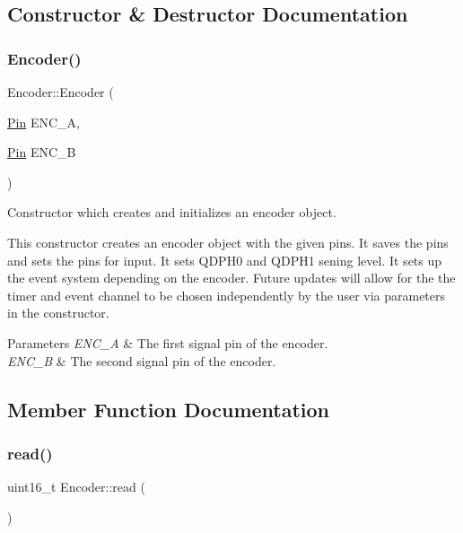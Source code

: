 \subsection{Constructor \& Destructor Documentation}
\mbox{\label{class_encoder_a93f2fbbe579422d267b87cf7a6673caf}} 
\subsubsection{\texorpdfstring{Encoder()}{Encoder()}}
{\footnotesize\ttfamily Encoder\+::\+Encoder (\begin{DoxyParamCaption}\item[{\mbox{\hyperlink{struct_pin}{Pin}}}]{E\+N\+C\+\_\+A,  }\item[{\mbox{\hyperlink{struct_pin}{Pin}}}]{E\+N\+C\+\_\+B }\end{DoxyParamCaption})}



Constructor which creates and initializes an encoder object. 

This constructor creates an encoder object with the given pins. It saves the pins and sets the pins for input. It sets Q\+D\+P\+H0 and Q\+D\+P\+H1 sening level. It sets up the event system depending on the encoder. Future updates will allow for the the timer and event channel to be chosen independently by the user via parameters in the constructor. 
\begin{DoxyParams}{Parameters}
{\em E\+N\+C\+\_\+A} & The first signal pin of the encoder. \\
\hline
{\em E\+N\+C\+\_\+B} & The second signal pin of the encoder. \\
\hline
\end{DoxyParams}


\subsection{Member Function Documentation}
\mbox{\label{class_encoder_a1d80d4b27aadd5198902d29b08b54b4c}} 
\subsubsection{\texorpdfstring{read()}{read()}}
{\footnotesize\ttfamily uint16\+\_\+t Encoder\+::read (\begin{DoxyParamCaption}{ }\end{DoxyParamCaption})}



